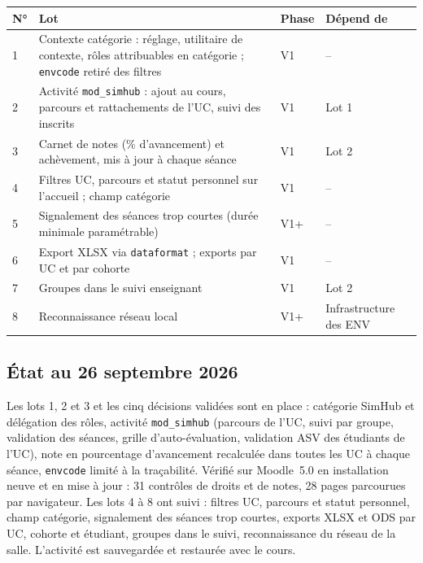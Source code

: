 \documentclass[11pt,a4paper]{article}
\newcommand{\code}[1]{\texttt{\small #1}}
\begin{document}
\begin{center}
\begin{tabularx}{\textwidth}{>{\raggedright}p{0.6cm}>{\raggedright}p{7.2cm}>{\raggedright}p{2cm}X}
\toprule
\textbf{N°} & \textbf{Lot} & \textbf{Phase} & \textbf{Dépend de} \\
\midrule
1 & Contexte catégorie : réglage, utilitaire de contexte, rôles attribuables en catégorie ;
\code{envcode} retiré des filtres & V1 & -- \\
2 & Activité \code{mod\_simhub} : ajout au cours, parcours et rattachements de l'UC, suivi des
inscrits & V1 & Lot 1 \\
3 & Carnet de notes (\% d'avancement) et achèvement, mis à jour à chaque séance & V1 & Lot 2 \\
4 & Filtres UC, parcours et statut personnel sur l'accueil ; champ catégorie & V1 & -- \\
5 & Signalement des séances trop courtes (durée minimale paramétrable) & V1+ & -- \\
6 & Export XLSX via \code{dataformat} ; exports par UC et par cohorte & V1 & -- \\
7 & Groupes dans le suivi enseignant & V1 & Lot 2 \\
8 & Reconnaissance réseau local & V1+ & Infrastructure des ENV \\
\bottomrule
\end{tabularx}
\end{center}

\subsection*{État au 26 septembre 2026}
Les lots 1, 2 et 3 et les cinq décisions validées sont en place : catégorie SimHub et
délégation des rôles, activité \code{mod\_simhub} (parcours de l'UC, suivi par groupe,
validation des séances, grille d'auto-évaluation, validation ASV des étudiants de l'UC),
note en pourcentage d'avancement recalculée dans toutes les UC à chaque séance,
\code{envcode} limité à la traçabilité. Vérifié sur Moodle~5.0 en installation neuve et en
mise à jour : 31 contrôles de droits et de notes, 28 pages parcourues par navigateur.
Les lots 4 à 8 ont suivi : filtres UC, parcours et statut personnel, champ catégorie,
signalement des séances trop courtes, exports XLSX et ODS par UC, cohorte et étudiant,
groupes dans le suivi, reconnaissance du réseau de la salle. L'activité est sauvegardée
et restaurée avec le cours.
\end{document}
